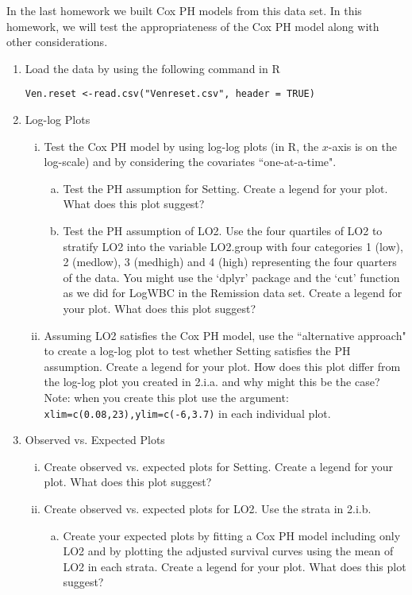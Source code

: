 \documentclass[12pt]{article}
\begin{document}
In the last homework we built Cox PH models from this data set. In this homework, we will test the appropriateness of the Cox PH model along with other considerations.
\begin{enumerate}[1.]
\item Load the data by using the following command in R

 \lstinline{Ven.reset <-read.csv("Venreset.csv", header = TRUE)}

\item Log-log Plots 
\begin{enumerate}[i.]
\item Test the Cox PH model by using log-log plots (in R, the $x$-axis is on the log-scale) and by considering the covariates ``one-at-a-time". 
\begin{enumerate}[a.] 
\item Test the PH assumption for Setting. Create a legend for your plot. What does this plot suggest?
\item Test the PH assumption of LO2. Use the four quartiles of LO2 to stratify LO2 into the variable LO2.group with four categories 1 (low), 2 (medlow), 3 (medhigh) and 4 (high) representing the four quarters of the data. You might use the `dplyr' package and the `cut' function as we did for LogWBC in the Remission data set. Create a legend for your plot.  What does this plot suggest?
\end{enumerate}
\item Assuming LO2 satisfies the Cox PH model, use the ``alternative approach" to create a log-log plot to test whether Setting satisfies the PH assumption. Create a legend for your plot. How does this plot differ from the log-log plot you created in 2.i.a. and why might this be the case? Note: when you create this plot use the argument: \lstinline{xlim=c(0.08,23),ylim=c(-6,3.7)} in each individual plot.
\end{enumerate}
\item Observed vs. Expected Plots
\begin{enumerate}[i.]
\item Create observed vs. expected plots for Setting. Create a legend for your plot. What does this plot suggest?
\item Create observed vs. expected plots for LO2. Use the strata in 2.i.b.
\begin{enumerate}[a.]
\item Create your expected plots by fitting a Cox PH model including only LO2 and by plotting the adjusted survival curves using the mean of LO2 in each strata. Create a legend for your plot. What does this plot suggest?

\end{enumerate}
\end{enumerate}
\end{enumerate}
\end{document}
